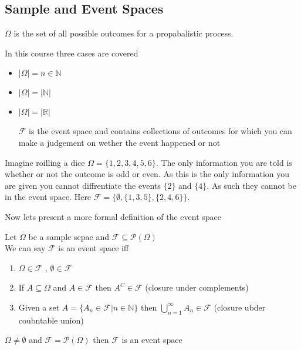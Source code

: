 \documentclass{article}
\begin{document}
\subsection{Sample and Event Spaces}
\begin{definition}
    $\Omega$ is the set of all possible outcomes for a propabalistic process.
\end{definition}
In this course three cases are covered
\begin{itemize}
    \item $|\Omega| = n \in \mathbb{N}$
    \item $|\Omega| = |\mathbb{N}|$
    \item $|\Omega| = |\mathbb{R}|$
    \begin{definition}
        $\mathcal{F}$ is the event space and contains collections of outcomes for which you can make a judgement on wether the event happened or not
    \end{definition}
\end{itemize}
\begin{example}
    Imagine roilling a dice $\Omega = \{1,2,3,4,5,6\}$. The only information you are told is whether or not the outcome is odd or even. As this is the only information you are given you cannot diffrentiate the events $\{2\}$ and $\{4\}$. As such they cannot be in the event space. Here $\mathcal{F} = \{\emptyset,\{1,3,5\},\{2,4,6\}\}$.
\end{example}
Now lets present a more formal definition of the event space
\begin{definition}
    Let $\Omega$ be a sample scpae and $\mathcal{F} \subseteq \mathcal{P}(\Omega)$ \\
    We can say $\mathcal{F}$ is an event space iff
    \begin{enumerate}
        \item $\Omega \in \mathcal{F}$ , $\emptyset \in \mathcal{F}$
        \item If $A \subseteq \Omega$ and $A \in \mathcal{F}$ then $A^C \in \mathcal{F}$ (closure under complements)
        \item Given a set $A = \{A_n \in \mathcal{F}| n \in \mathbb{N}\}$ then $\bigcup_{n=1}^{\infty}A_n \in \mathcal{F}$ (closure ubder coubntable union)
    \end{enumerate}
\end{definition}
\begin{proposition}
    $\Omega \ne \emptyset$ and $\mathcal{F} = \mathcal{P}(\Omega)$ then $\mathcal{F}$ is an event space
\end{proposition}
\end{document}
